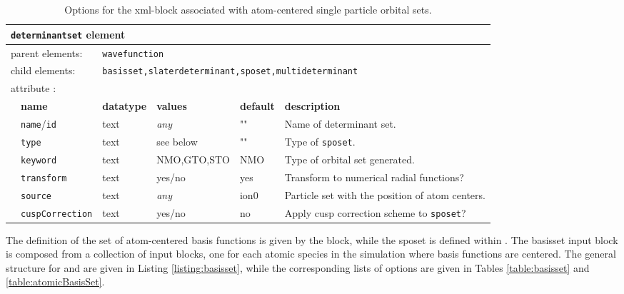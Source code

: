 \begin{table}[h]
\begin{center}
\begin{tabularx}{\textwidth}{l l l l l l }
\hline
\multicolumn{6}{l}{\texttt{determinantset} element} \\
\hline
\multicolumn{2}{l}{parent elements:} & \multicolumn{4}{l}{\texttt{wavefunction}}\\
\multicolumn{2}{l}{child  elements:} & \multicolumn{4}{l}{\texttt{basisset,slaterdeterminant,sposet,multideterminant}}\\
\multicolumn{2}{l}{attribute      :} & \multicolumn{4}{l}{}\\
   &   \bfseries name              & \bfseries datatype & \bfseries values & \bfseries default   & \bfseries description \\
   &   \texttt{name}/\texttt{id}   &  text              &  \textit{any}    &  ""             & Name of determinant set. \\
   &   \texttt{type}                    &  text               &   see below   &   ""            &  Type of \texttt{sposet}. \\
   &   \texttt{keyword}             &  text               &   NMO,GTO,STO   &  NMO        & Type of orbital set generated. \\  
   &   \texttt{transform}           &  text               &   yes/no          &  yes         &  Transform to numerical radial functions?  \\
   &   \texttt{source}               &  text               &   \textit{any}    &  ion0        & Particle set with the position of atom centers. \\
   &   \texttt{cuspCorrection}  &  text               &   yes/no          &  no         & Apply cusp correction scheme to \texttt{sposet}? \\
  \hline
\end{tabularx}
\end{center}
\caption{Options for the  xml-block associated with atom-centered single particle orbital sets.}
\label{table:determinantset}
\end{table}

The definition of the set of atom-centered basis functions is given by the  block, while the sposet is defined within . The basisset input block is composed from a collection of  input blocks, one for each atomic species in the simulation where basis functions are centered. The general structure for  and  are given in Listing \ref{listing:basisset}, while the corresponding lists of options are given in Tables \ref{table:basisset} and \ref{table:atomicBasisSet}.

